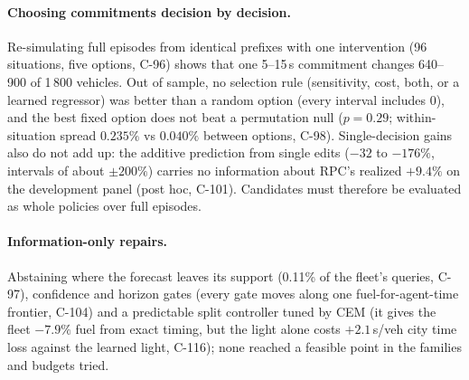 \documentclass[11pt]{article}
\begin{document}
\paragraph{Choosing commitments decision by decision.} Re-simulating full episodes from identical prefixes with one intervention
(96 situations, five options, C-96) shows that one 5--15\,s commitment changes 640--900 of 1\,800 vehicles. Out of sample, no selection
rule (sensitivity, cost, both, or a learned regressor) was better than a random option (every interval includes 0), and the best fixed option does not beat a permutation null
($p=0.29$; within-situation spread $0.235\%$ vs $0.040\%$ between options, C-98). Single-decision gains also do not add up: the
additive prediction from single edits ($-32$ to $-176\%$, intervals of about $\pm200\%$) carries no information about RPC's realized
$+9.4\%$ on the development panel (post hoc, C-101). Candidates must therefore be evaluated as
whole policies over full episodes.
\paragraph{Information-only repairs.} Abstaining where the forecast leaves its support (0.11\% of the fleet's queries, C-97), confidence and
horizon gates (every gate moves along one fuel-for-agent-time frontier, C-104) and a predictable split controller tuned by CEM (it gives the
fleet $-7.9\%$ fuel from exact timing, but the light alone costs $+2.1$\,s/veh city time loss against the learned light, C-116); none
reached a feasible point in the families and budgets tried.
\end{document}
